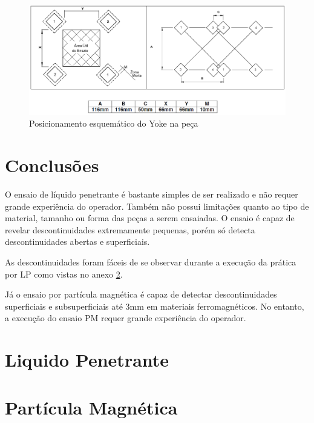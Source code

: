 \documentclass[12pt,oneside]{article}
\begin{document}
\begin{figure}[b!]
    \centering
    \includegraphics[width = 0.85\linewidth]{figuras/pm-esquema.png}
    \caption{Posicionamento esquemático do Yoke na peça}
    \label{fig:pm-esquema}
\end{figure}

\clearpage
\section{Conclusões}
O ensaio de líquido penetrante é bastante simples de ser realizado e não
requer grande experiência do operador. Também não possui limitações quanto
ao tipo de material, tamanho ou forma das peças a serem ensaiadas.
O ensaio é capaz de revelar descontinuidades extremamente pequenas, porém
só detecta descontinuidades abertas e superficiais.

As descontinuidades foram fáceis de se observar durante a execução da prática
por LP como vistas no anexo \ref{anexo:lp}.


Já o ensaio por partícula magnética é capaz de detectar descontinuidades
superficiais e subsuperficiais até 3mm em materiais ferromagnéticos.
No entanto, a execução do ensaio PM requer grande experiência do operador.








\clearpage

\appendix
\section{Liquido Penetrante}
\label{anexo:lp}
\clearpage

\section{Partícula Magnética}
\label{anexo:pm}
\clearpage

\printbibliography[heading=bibintoc] %
\end{document}
